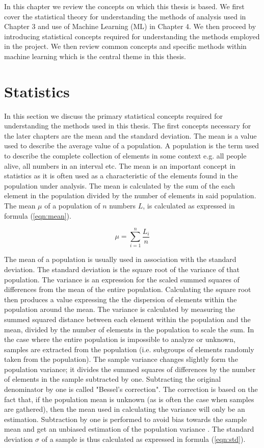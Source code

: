 In this chapter we review the concepts on which this thesis is based. We first cover the statistical theory for understanding the methods of analysis used in Chapter 3 and use of Machine Learning (ML) in Chapter 4. We then proceed by introducing statistical concepts required for understanding the methods employed in the project. We then review common concepts and specific methods within machine learning which is the central theme in this thesis.


\section{Statistics}

In this section we discuss the primary statistical concepts required for understanding the methods used in this thesis. The first concepts necessary for the later chapters are the mean and the standard deviation. The mean is a value used to describe the average value of a population. A population is the term used to describe the complete collection of elements in some context e.g. all people alive, all numbers in an interval etc. The mean is an important concept in statistics as it is often used as a characteristic of the elements found in the population under analysis. The mean is calculated by the sum of the each element in the population divided by the number of elements in said population. The mean $\mu$ of a population of $n$ numbers $L$, is calculated as expressed in formula (\ref{eqn:mean}).

\begin{equation}
\label{eqn:mean}
\mu = \sum_{i=1}^n \frac{L_i}{n}
\end{equation}

The mean of a population is usually used in association with the standard deviation. The standard deviation is the square root of the variance of that population. The variance is an expression for the scaled summed squares of differences from the mean of the entire population. Calculating the square root then produces a value expressing the the dispersion of elements within the population around the mean. The variance is calculated by measuring the summed squared distance between each element within the population and the mean, divided by the number of elements in the population to scale the sum. In the case where the entire population is impossible to analyze or unknown, samples are extracted from the population (i.e. subgroups of elements randomly taken from the population). The sample variance changes slightly form the population variance; it divides the summed squares of differences by the number of elements in the sample subtracted by one. Subtracting the original denominator by one is called "Bessel's correction". The correction is based on the fact that, if the population mean is unknown (as is often the case when samples are gathered), then the mean used in calculating the variance will only be an estimation. Subtraction by one is performed to avoid bias towards the sample mean and get an unbiased estimation of the population variance \cite{so2008sample, nobach2020practical}. The standard deviation $\sigma$ of a sample is thus calculated as expressed in formula (\ref{eqn:std}).

